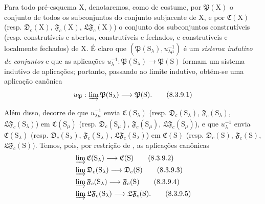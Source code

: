 \begin{env}[8.3.9]
\label{IV.8.3.9}
Para todo pré-esquema $\mathrm{X}$, denotaremos, como de costume, por $\mathfrak{P}(\mathrm{X})$ o conjunto de todos os subconjuntos do conjunto subjacente de $\mathrm{X}$, e por $\mathfrak{C}(\mathrm{X})$ (resp. $\mathfrak{D}_c(\mathrm{X})$, $\mathfrak{F}_c(\mathrm{X})$, $\mathfrak{LF}_c(\mathrm{X})$) o conjunto dos subconjuntos construtíveis (resp. construtíveis e abertos, construtíveis e fechados, e construtíveis e localmente fechados) de $\mathrm{X}$.
É claro que $(\mathfrak{P}(\mathrm{S}_\lambda),u_{\lambda\mu}^{-1})$ é um \emph{sistema indutivo de conjuntos} e que as aplicações $u_\lambda^{-1}:\mathfrak{P}(\mathrm{S}_\lambda)\to\mathfrak{P}(\mathrm{S})$ formam um sistema indutivo de aplicações; portanto, passando ao limite indutivo, obtém-se uma aplicação canônica
\begin{equation}
  u_\mathfrak{P}:\varinjlim\mathfrak{P}(\mathrm{S}_\lambda)\to\mathfrak{P}(\mathrm{S}).
  \tag{8.3.9.1}
\label{IV.8.3.9.1}
\end{equation}

Além disso, decorre de  que $u_{\lambda\mu}^{-1}$ envia $\mathfrak{C}(\mathrm{S}_\lambda)$ (resp. $\mathfrak{D}_c(\mathrm{S}_\lambda)$, $\mathfrak{F}_c(\mathrm{S}_\lambda)$, $\mathfrak{LF}_c(\mathrm{S}_\lambda)$) em $\mathfrak{C}(\mathrm{S}_\mu)$ (resp. $\mathfrak{D}_c(\mathrm{S}_\mu)$, $\mathfrak{F}_c(\mathrm{S}_\mu)$, $\mathfrak{LF}_c(\mathrm{S}_\mu)$), e que $u_\lambda^{-1}$ envia $\mathfrak{C}(\mathrm{S}_\lambda)$ (resp. $\mathfrak{D}_c(\mathrm{S}_\lambda)$, $\mathfrak{F}_c(\mathrm{S}_\lambda)$, $\mathfrak{LF}_c(\mathrm{S}_\lambda)$) em $\mathfrak{C}(\mathrm{S})$ (resp. $\mathfrak{D}_c(\mathrm{S})$, $\mathfrak{F}_c(\mathrm{S})$, $\mathfrak{LF}_c(\mathrm{S})$).
Temos, pois, por restrição de , as aplicações canônicas
\begin{align}
  &\varinjlim\mathfrak{C}(\mathrm{S}_\lambda)\to\mathfrak{C}(\mathrm{S}) \tag{8.3.9.2}\label{IV.8.3.9.2}\\
  &\varinjlim\mathfrak{D}_c(\mathrm{S}_\lambda)\to\mathfrak{D}_c(\mathrm{S}) \tag{8.3.9.3}\label{IV.8.3.9.3}\\
  &\varinjlim\mathfrak{F}_c(\mathrm{S}_\lambda)\to\mathfrak{F}_c(\mathrm{S}) \tag{8.3.9.4}\label{IV.8.3.9.4}\\
  &\varinjlim\mathfrak{LF}_c(\mathrm{S}_\lambda)\to\mathfrak{LF}_c(\mathrm{S}). \tag{8.3.9.5}
\label{IV.8.3.9.5}
\end{align}
\end{env}

